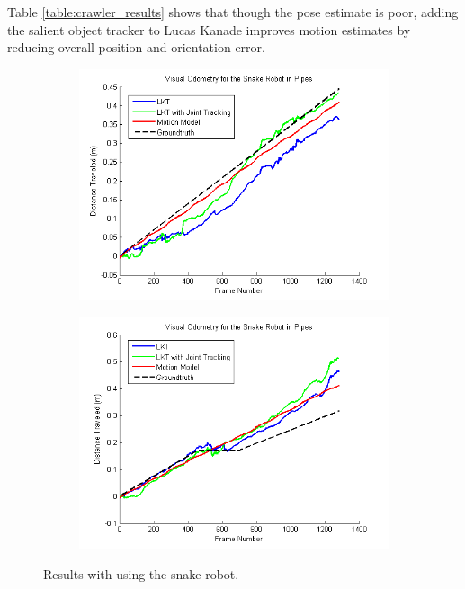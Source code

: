 \documentclass[letterpaper, 10 pt, conference]{ieeeconf}
\begin{document}
Table \ref{table:crawler_results} shows that though the pose estimate is poor, adding the salient object tracker to Lucas Kanade improves motion estimates by reducing overall position and orientation error.

\begin{figure}[tb]
	\centering
	\begin{subfigure}{\columnwidth}
		  \centering
		  \includegraphics[width=\columnwidth]{trial8_results.png}
		  \label{snakes:trial8}
	\end{subfigure}
	\begin{subfigure}{\columnwidth}
		  \centering
		  \includegraphics[width=\columnwidth]{trial9_results.png}
		  \label{snakes:trial9}
	\end{subfigure}
	\caption{Results with using the snake robot.}
    \label{snakes}
\end{figure}
\end{document}

